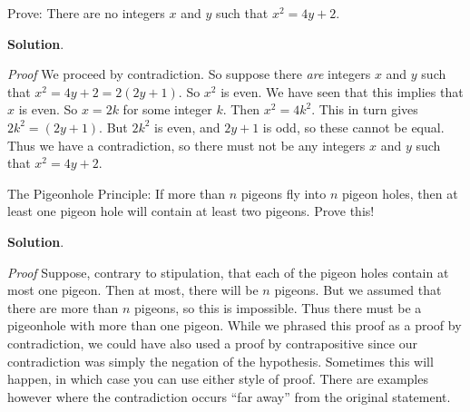 \documentclass[11pt,]{book}
\makeatletter
\theoremstyle{ptxplainnotitle}
\theoremstyle{ptxplaintitle}
\renewcommand*{\proofname}{Proof}
\renewenvironment{proof}[1][\proofname]{\par
  \pushQED{\qed}%
  \normalfont \topsep6\p@\@plus6\p@\relax
  \trivlist
  \item\relax
    {\itshape
    #1\@addpunct{.}}\hspace\labelsep\ignorespaces
}{%
  \popQED\endtrivlist\@endpefalse
}
\theoremstyle{ptxdefinitionnotitle}
\theoremstyle{ptxdefinitiontitle}
\theoremstyle{ptxdefinitionnotitle}
\theoremstyle{ptxdefinitiontitle}
\theoremstyle{ptxdefinitionnotitle}
\theoremstyle{ptxdefinitiontitle}
\theoremstyle{ptxdefinitiontitlenonumber}
\theoremstyle{ptxdefinitiontitlenonumber}
\numberwithin{equation}{chapter}
\makeatother
\begin{document}
\begin{example}\label{example-69}
\hypertarget{p-2430}{}%
Prove: There are no integers \(x\) and \(y\) such that \(x^2  = 4y + 2\).%
\par\smallskip%
\noindent\textbf{Solution}.\hypertarget{solution-252}{}\quad%
\begin{proof}\hypertarget{proof-28}{}
\hypertarget{p-2431}{}%
We proceed by contradiction. So suppose there \emph{are} integers \(x\) and \(y\) such that \(x^2 = 4y + 2 = 2(2y + 1)\). So \(x^2\) is even. We have seen that this implies that \(x\) is even. So \(x = 2k\) for some integer \(k\). Then \(x^2 = 4k^2\). This in turn gives \(2k^2 = (2y + 1)\). But \(2k^2\) is even, and \(2y + 1\) is odd, so these cannot be equal. Thus we have a contradiction, so there must not be any integers \(x\) and \(y\) such that \(x^2 = 4y + 2\).%
\end{proof}
\end{example}
\begin{example}\label{example-70}
\hypertarget{p-2432}{}%
The Pigeonhole Principle: If more than \(n\) pigeons fly into \(n\) pigeon holes, then at least one pigeon hole will contain at least two pigeons. Prove this!%
\par\smallskip%
\noindent\textbf{Solution}.\hypertarget{solution-253}{}\quad%
\begin{proof}\hypertarget{proof-29}{}
\hypertarget{p-2433}{}%
Suppose, contrary to stipulation, that each of the pigeon holes contain at most one pigeon. Then at most, there will be \(n\) pigeons. But we assumed that there are more than \(n\) pigeons, so this is impossible. Thus there must be a pigeonhole with more than one pigeon.%
\end{proof}
\hypertarget{p-2434}{}%
While we phrased this proof as a proof by contradiction, we could have also used a proof by contrapositive since our contradiction was simply the negation of the hypothesis. Sometimes this will happen, in which case you can use either style of proof. There are examples however where the contradiction occurs ``far away'' from the original statement.%
\end{example}
\typeout{************************************************}
\typeout{************************************************}
\end{document}
